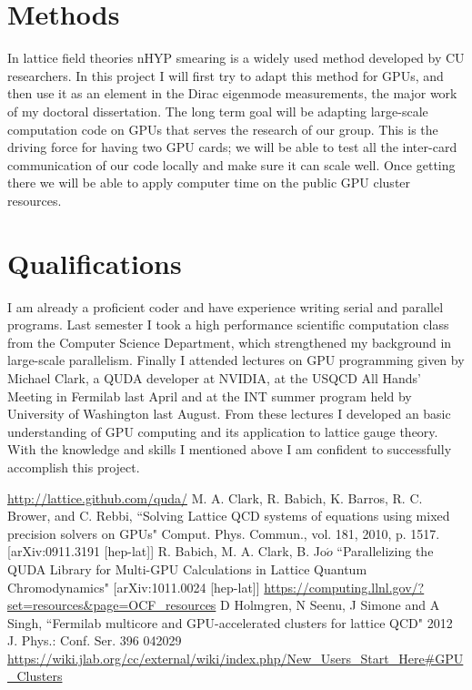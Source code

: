 \documentclass[11pt]{article}
\begin{document}
   \section*{Methods} %
  In lattice field theories nHYP smearing is a widely used method developed by CU researchers. 
  In this project I will first try to adapt this method for GPUs, and then use it as an element in the Dirac eigenmode measurements, the major work of my doctoral dissertation. The long term goal will be adapting large-scale computation code on GPUs that serves the research of our group. This is the driving force for having two GPU cards; we will be able to test all the inter-card communication of our code locally and make sure it can scale well. Once getting there we will be able to apply computer time on the public GPU cluster resources. 
    
  \section*{Qualifications} %
  I am already a proficient coder and have experience writing serial and parallel programs.
  Last semester I took a high performance scientific computation class from the Computer Science Department, which strengthened my background in large-scale parallelism.
  Finally I attended lectures on GPU programming given by Michael Clark, a QUDA developer at NVIDIA, at the USQCD All Hands' Meeting in Fermilab last April and at the INT summer program held by University of Washington last August. 
  From these lectures I developed an basic understanding of GPU computing and its application to lattice gauge theory. 
  With the knowledge and skills I mentioned above I am confident to successfully accomplish this project.

%
\begin{thebibliography}{99}
\url{http://lattice.github.com/quda/}
M. A. Clark, R. Babich, K. Barros, R. C. Brower, and C. Rebbi,
``Solving Lattice QCD systems of equations using mixed precision solvers on GPUs" Comput. Phys. Commun., vol. 181, 2010, p. 1517. [arXiv:0911.3191 
[hep-lat]]
R. Babich, M. A. Clark, B. Jo$\acute{o}$ ``Parallelizing the QUDA Library for Multi-GPU Calculations in Lattice Quantum Chromodynamics" [arXiv:1011.0024 
[hep-lat]]
\url{https://computing.llnl.gov/?set=resources&page=OCF_resources}
D Holmgren, N Seenu, J Simone and A Singh, ``Fermilab multicore and GPU-accelerated clusters for lattice QCD" 2012 J. Phys.: Conf. Ser. 396 042029
\url{https://wiki.jlab.org/cc/external/wiki/index.php/New_Users_Start_Here#GPU_Clusters}

\end{thebibliography}
\end{document}
